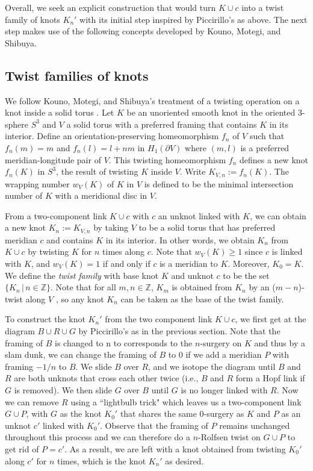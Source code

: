 \documentclass[11pt,usenames,dvipsnames,reqno]{amsart}
\numberwithin{theorem}{section}
\theoremstyle{ex}
\theoremstyle{rem}
\begin{document}
Overall, we seek an explicit construction that would turn $K \cup c$ into a twist family of knots $K_n'$ with its initial step inspired by Piccirillo's as above. The next step makes use of the following concepts developed by Kouno, Motegi, and Shibuya.

\subsection{Twist families of knots}

We follow Kouno, Motegi, and Shibuya's treatment of a twisting operation on a knot inside a solid torus . Let $K$ be an unoriented smooth knot in the oriented 3-sphere $S^3$ and $V$ a solid torus with a preferred framing that contains $K$ in its interior. Define an orientation-preserving homeomorphism $f_n$ of $V$ such that $f_n(m)=m$ and  $f_n(l)=l+nm$ in $H_1(\partial V)$ where $(m, l)$ is a preferred meridian-longitude pair of $V$. This twisting homeomorphism $f_n$ defines a new knot $f_n(K)$ in $S^3$, the result of twisting $K$ inside $V$. Write $K_{V,n} := f_n(K)$. The wrapping number $w_V(K)$ of $K$ in $V$ is defined to be the minimal intersection number of $K$ with a meridional disc in $V$.

From a two-component link $K\cup c$ with $c$ an unknot linked with $K$, we can obtain a new knot $K_n := K_{V,n}$ by taking $V$ to be a solid torus that has preferred meridian $c$ and contains $K$ in its interior. In other words, we obtain $K_n$ from $K\cup c$ by twisting $K$ for $n$ times along $c$. Note that $w_V(K)\geq 1$ since $c$ is linked with $K$, and $w_V(K)=1$ if and only if $c$ is a meridian to $K$. Moreover, $K_0=K$. We define the \textit{twist family} with base knot $K$ and unknot $c$ to be the set $\{K_n \,|\, n \in \mathbb{Z}\}$. Note that for all $m, n\in\mathbb{Z}$,  $K_m$ is obtained from $K_n$ by an ($m-n$)-twist along $V$ \cite[Remark 2.2]{twisting-knot-types}, so any knot $K_n$ can be taken as the base of the twist family. 

To construct the knot $K_n'$ from the two component link $K \cup c$, we first get at the diagram $B\cup R \cup G$ by Piccirillo's as in the previous section. Note that the framing of $B$ is changed to n to corresponds to the $n$-surgery on $K$ and thus by a slam dunk, we can change the framing of $B$ to 0 if we add a meridian $P$ with framing $-1/n$ to $B$. We slide $B$ over $R$, and we isotope the diagram until $B$ and $R$ are both unknots that cross each other twice (i.e., $B$ and $R$ form a Hopf link if $G$ is removed). We then slide $G$ over $B$ until $G$ is no longer linked with $R$. Now we can remove $R$ using a ``lightbulb trick" which leaves us a two-component link $G\cup P$, with $G$ as the knot $K_0'$ that shares the same 0-surgery as $K$ and $P$ as an unknot $c'$ linked with $K_0'$. Observe that the framing of $P$ remains unchanged throughout this process and we can therefore do a $n$-Rolfsen twist on $G\cup P$ to get rid of $P=c'$. As a result, we are left with a knot obtained from twisting $K_0'$ along $c'$ for $n$ times, which is the knot $K_n'$ as desired.
\end{document}
